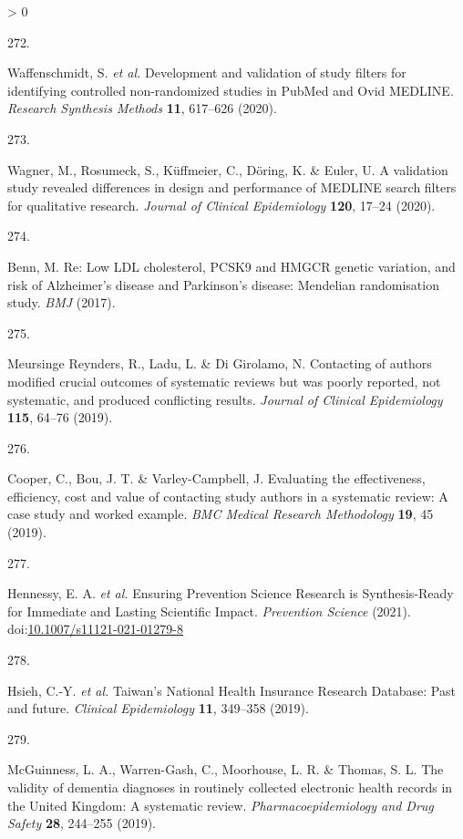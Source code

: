 \documentclass[a4paper, twoside]{templates/ociamthesis}
\newlength{\cslhangindent}
\newlength{\csllabelwidth}
\newenvironment{CSLReferences}[3] %
 {%
  \setlength{\parindent}{0pt}
  \ifodd #1 \everypar{\setlength{\hangindent}{\cslhangindent}}\ignorespaces\fi
  \ifnum #2 > 0
  \setlength{\parskip}{#2\baselineskip}
  \fi
 }%
 {}
\newcommand{\CSLLeftMargin}[1]{\parbox[t]{\maxof{\widthof{#1}}{\csllabelwidth}}{#1}}
\newcommand{\CSLRightInline}[1]{\parbox[t]{\linewidth - \csllabelwidth}{#1}}
\begin{document}
\begin{CSLReferences}{0}{0}
\leavevmode\hypertarget{ref-waffenschmidt2020}{}%
\CSLLeftMargin{272. }
\CSLRightInline{Waffenschmidt, S. \emph{et al.} Development and validation of study filters for identifying controlled non-randomized studies in {PubMed} and {Ovid MEDLINE}. \emph{Research Synthesis Methods} \textbf{11}, 617--626 (2020).}

\leavevmode\hypertarget{ref-wagner2020}{}%
\CSLLeftMargin{273. }
\CSLRightInline{Wagner, M., Rosumeck, S., Küffmeier, C., Döring, K. \& Euler, U. A validation study revealed differences in design and performance of {MEDLINE} search filters for qualitative research. \emph{Journal of Clinical Epidemiology} \textbf{120}, 17--24 (2020).}

\leavevmode\hypertarget{ref-benn2017comment}{}%
\CSLLeftMargin{274. }
\CSLRightInline{Benn, M. Re: Low {LDL} cholesterol, {PCSK9} and {HMGCR} genetic variation, and risk of {Alzheimer}'s disease and {Parkinson}'s disease: Mendelian randomisation study. \emph{BMJ} (2017).}

\leavevmode\hypertarget{ref-meursingereynders2019}{}%
\CSLLeftMargin{275. }
\CSLRightInline{Meursinge Reynders, R., Ladu, L. \& Di Girolamo, N. Contacting of authors modified crucial outcomes of systematic reviews but was poorly reported, not systematic, and produced conflicting results. \emph{Journal of Clinical Epidemiology} \textbf{115}, 64--76 (2019).}

\leavevmode\hypertarget{ref-cooper2019}{}%
\CSLLeftMargin{276. }
\CSLRightInline{Cooper, C., Bou, J. T. \& Varley-Campbell, J. Evaluating the effectiveness, efficiency, cost and value of contacting study authors in a systematic review: A case study and worked example. \emph{BMC Medical Research Methodology} \textbf{19}, 45 (2019).}

\leavevmode\hypertarget{ref-hennessy2021}{}%
\CSLLeftMargin{277. }
\CSLRightInline{Hennessy, E. A. \emph{et al.} Ensuring {Prevention Science Research} is {Synthesis}-{Ready} for {Immediate} and {Lasting Scientific Impact}. \emph{Prevention Science} (2021). doi:\href{https://doi.org/10.1007/s11121-021-01279-8}{10.1007/s11121-021-01279-8}}

\leavevmode\hypertarget{ref-hsieh2019}{}%
\CSLLeftMargin{278. }
\CSLRightInline{Hsieh, C.-Y. \emph{et al.} Taiwan's {National Health Insurance Research Database}: Past and future. \emph{Clinical Epidemiology} \textbf{11}, 349--358 (2019).}

\leavevmode\hypertarget{ref-mcguinness2019validity}{}%
\CSLLeftMargin{279. }
\CSLRightInline{McGuinness, L. A., Warren-Gash, C., Moorhouse, L. R. \& Thomas, S. L. The validity of dementia diagnoses in routinely collected electronic health records in the {United Kingdom}: A systematic review. \emph{Pharmacoepidemiology and Drug Safety} \textbf{28}, 244--255 (2019).}


\end{CSLReferences}
\end{document}
